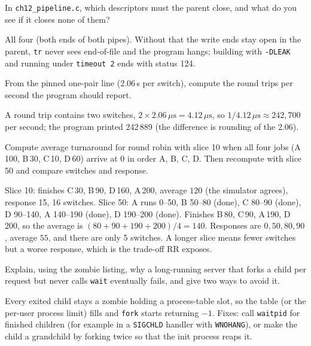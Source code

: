 \begin{exercise}[easy]
In \texttt{ch12\_pipeline.c}, which descriptors must the parent
close, and what do you see if it closes none of them?
\end{exercise}
\begin{solution}[hint]
All four (both ends of both pipes). Without that the write ends stay
open in the parent, \texttt{tr} never sees end-of-file and the
program hangs; building with \texttt{-DLEAK} and running under
\texttt{timeout 2} ends with status 124.
\end{solution}

\begin{exercise}[easy]
From the pinned one-pair line (2.06\,\textmu s per switch), compute
the round trips per second the program should report.
\end{exercise}
\begin{solution}[hint]
A round trip contains two switches, $2\times2.06\,\mu\text{s}=4.12\,\mu\text{s}$,
so $1/4.12\,\mu\text{s}\approx242{,}700$ per second; the program printed
242\,889 (the difference is rounding of the 2.06).
\end{solution}

\begin{exercise}[medium]
Compute average turnaround for round robin with slice 10 when all
four jobs (A\,100, B\,30, C\,10, D\,60) arrive at 0 in order A, B, C, D.
Then recompute with slice 50 and compare switches and response.
\end{exercise}
\begin{solution}[hint]
Slice 10: finishes C\,30, B\,90, D\,160, A\,200, average $120$
(the simulator agrees), response 15, 16 switches. Slice 50: A runs
0--50, B 50--80 (done), C 80--90 (done), D 90--140, A 140--190
(done), D 190--200 (done). Finishes B\,80, C\,90, A\,190, D\,200, so
the average is $(80+90+190+200)/4=140$. Responses are $0,50,80,90$,
average $55$, and there are only 5 switches. A longer slice means
fewer switches but a worse response, which is the trade-off RR
exposes.
\end{solution}

\begin{exercise}[hard]
Explain, using the zombie listing, why a long-running server that
forks a child per request but never calls \texttt{wait} eventually
fails, and give two ways to avoid it.
\end{exercise}
\begin{solution}[hint]
Every exited child stays a zombie holding a process-table slot, so
the table (or the per-user process limit) fills and \texttt{fork}
starts returning $-1$. Fixes: call \texttt{waitpid} for finished
children (for example in a \texttt{SIGCHLD} handler with
\texttt{WNOHANG}), or make the child a grandchild by forking twice
so that the init process reaps it.
\end{solution}

